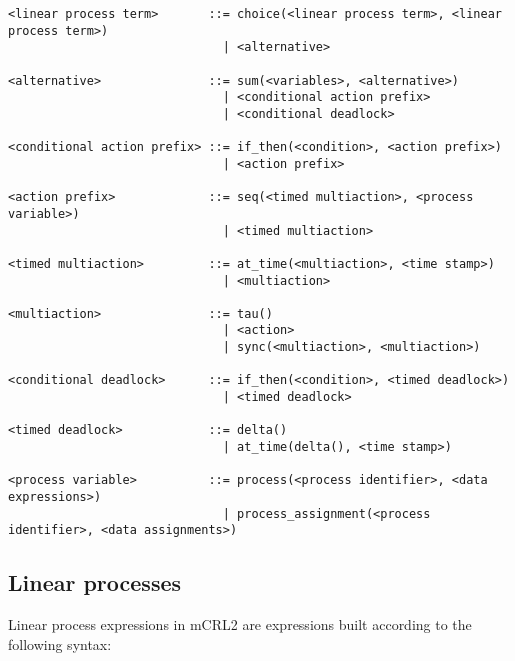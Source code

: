 \documentclass{article}
\begin{document}
\bigskip
\begin{verbatim}
<linear process term>       ::= choice(<linear process term>, <linear process term>)
                              | <alternative>
 
<alternative>               ::= sum(<variables>, <alternative>)
                              | <conditional action prefix>
                              | <conditional deadlock>
 
<conditional action prefix> ::= if_then(<condition>, <action prefix>)
                              | <action prefix>
 
<action prefix>             ::= seq(<timed multiaction>, <process variable>)
                              | <timed multiaction>
 
<timed multiaction>         ::= at_time(<multiaction>, <time stamp>)
                              | <multiaction>
 
<multiaction>               ::= tau()
                              | <action>
                              | sync(<multiaction>, <multiaction>)
 
<conditional deadlock>      ::= if_then(<condition>, <timed deadlock>)
                              | <timed deadlock>
 
<timed deadlock>            ::= delta()
                              | at_time(delta(), <time stamp>)
 
<process variable>          ::= process(<process identifier>, <data expressions>)
                              | process_assignment(<process identifier>, <data assignments>)                      
\end{verbatim}

\bigskip \pagebreak 

\subsection{\protect\bigskip Linear processes}

Linear process expressions in mCRL2 are expressions built according to the
following syntax:
\end{document}

